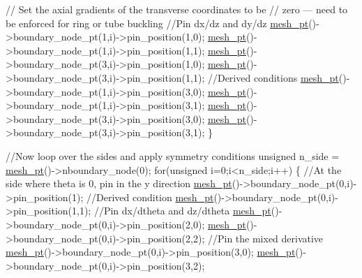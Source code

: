\begin{DoxyCodeInclude}
   \textcolor{comment}{// Set the axial gradients of the transverse coordinates to be}
   \textcolor{comment}{// zero --- need to be enforced for ring or tube buckling}
   \textcolor{comment}{//Pin dx/dz and dy/dz}
   \hyperlink{classShellProblem_a1905a1b913469ed54f7c8f55d133ff57}{mesh\_pt}()->boundary\_node\_pt(1,i)->pin\_position(1,0);
   \hyperlink{classShellProblem_a1905a1b913469ed54f7c8f55d133ff57}{mesh\_pt}()->boundary\_node\_pt(1,i)->pin\_position(1,1);
   \hyperlink{classShellProblem_a1905a1b913469ed54f7c8f55d133ff57}{mesh\_pt}()->boundary\_node\_pt(3,i)->pin\_position(1,0);
   \hyperlink{classShellProblem_a1905a1b913469ed54f7c8f55d133ff57}{mesh\_pt}()->boundary\_node\_pt(3,i)->pin\_position(1,1);
   \textcolor{comment}{//Derived conditions}
   \hyperlink{classShellProblem_a1905a1b913469ed54f7c8f55d133ff57}{mesh\_pt}()->boundary\_node\_pt(1,i)->pin\_position(3,0);
   \hyperlink{classShellProblem_a1905a1b913469ed54f7c8f55d133ff57}{mesh\_pt}()->boundary\_node\_pt(1,i)->pin\_position(3,1);
   \hyperlink{classShellProblem_a1905a1b913469ed54f7c8f55d133ff57}{mesh\_pt}()->boundary\_node\_pt(3,i)->pin\_position(3,0);
   \hyperlink{classShellProblem_a1905a1b913469ed54f7c8f55d133ff57}{mesh\_pt}()->boundary\_node\_pt(3,i)->pin\_position(3,1);
 \}

 \textcolor{comment}{//Now loop over the sides and apply symmetry conditions}
 \textcolor{keywordtype}{unsigned} n\_side = \hyperlink{classShellProblem_a1905a1b913469ed54f7c8f55d133ff57}{mesh\_pt}()->nboundary\_node(0);
 \textcolor{keywordflow}{for}(\textcolor{keywordtype}{unsigned} i=0;i<n\_side;i++)
  \{
   \textcolor{comment}{//At the side where theta is 0, pin in the y direction}
   \hyperlink{classShellProblem_a1905a1b913469ed54f7c8f55d133ff57}{mesh\_pt}()->boundary\_node\_pt(0,i)->pin\_position(1);
   \textcolor{comment}{//Derived condition}
   \hyperlink{classShellProblem_a1905a1b913469ed54f7c8f55d133ff57}{mesh\_pt}()->boundary\_node\_pt(0,i)->pin\_position(1,1);
   \textcolor{comment}{//Pin dx/dtheta and dz/dtheta}
   \hyperlink{classShellProblem_a1905a1b913469ed54f7c8f55d133ff57}{mesh\_pt}()->boundary\_node\_pt(0,i)->pin\_position(2,0);
   \hyperlink{classShellProblem_a1905a1b913469ed54f7c8f55d133ff57}{mesh\_pt}()->boundary\_node\_pt(0,i)->pin\_position(2,2);
   \textcolor{comment}{//Pin the mixed derivative}
   \hyperlink{classShellProblem_a1905a1b913469ed54f7c8f55d133ff57}{mesh\_pt}()->boundary\_node\_pt(0,i)->pin\_position(3,0);
   \hyperlink{classShellProblem_a1905a1b913469ed54f7c8f55d133ff57}{mesh\_pt}()->boundary\_node\_pt(0,i)->pin\_position(3,2);


\end{DoxyCodeInclude}
